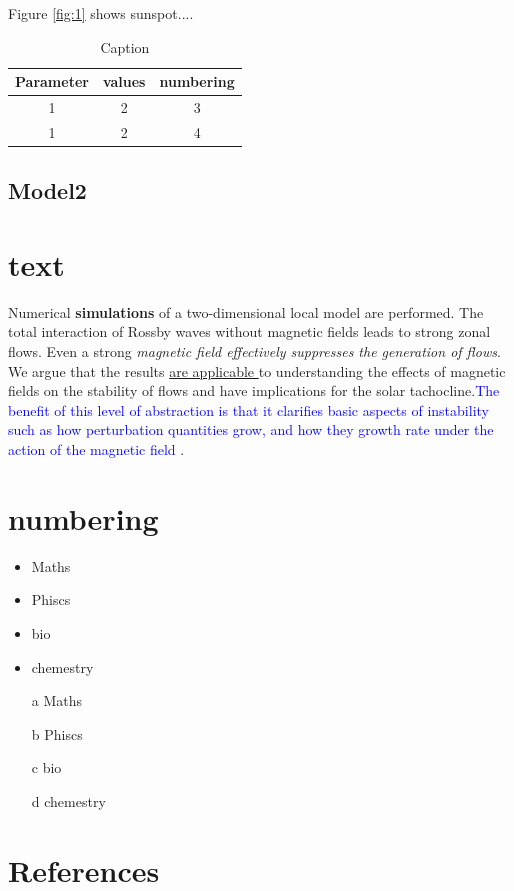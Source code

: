 \documentclass{article}
\begin{document}
Figure \ref{fig:1} shows sunspot....



\begin{table}[h]
    \centering
    \begin{tabular}{|c|c|c|}
    \hline
    Parameter& values& numbering\\
    \hline
         1&2&3  \\
         1&2&4\\ 
         \hline
    \end{tabular}
    \caption{Caption}
    \label{tab:my_label}
\end{table}

\subsection{Model2}



\section{text}
Numerical \textbf{simulations} of a two-dimensional local model are performed. The total interaction of Rossby waves without magnetic fields leads to strong zonal flows. Even a strong \textit{magnetic field effectively suppresses the generation of flows}. \cite{algatheem2023zonostrophic}We argue that the results \underline{are applicable }to understanding the effects of magnetic fields on the stability of flows and have implications for the solar tachocline.\textcolor{blue}{The benefit of this level of abstraction is that it clarifies basic aspects of instability such as how perturbation quantities grow, and how they growth rate\citep{durston2016transport} under the action of the magnetic field }.

\section{numbering}
\begin{itemize}
    \item Maths
    \item Phiscs
    \item bio
    \item chemestry
\end{itemize}

\begin{enumerate}
     \item [a]Maths
    \item [b]Phiscs
    \item [c]bio
    \item [d]chemestry
\end{enumerate}

\section{References}



\end{document}
